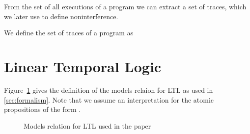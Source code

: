\documentclass{llncs}
\begin{document}
From the set of all executions of a program we can extract a set of
traces, which we later use to define noninterference.
\begin{definition}
  We define the set of traces of a program  as

\end{definition}


\section{Linear Temporal Logic}
\label{sec:ltl}

Figure~\ref{fig:ltl} gives the definition of the models relaion for
LTL as used in \ref{sec:formalism}.  Note that we assume an
interpretation  for the atomic propositions of
the form .

\begin{figure}[!t]
  \small
  
  \caption{Models relation for LTL used in the paper}
  \label{fig:ltl}
\end{figure}
\end{document}
